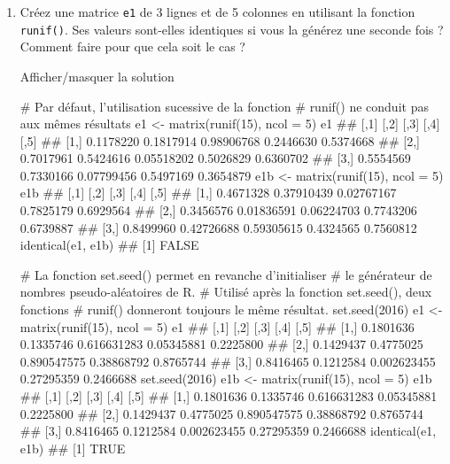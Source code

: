 \documentclass[12pt,]{article}
\newenvironment{Shaded}{}{}
\newcommand{\KeywordTok}[1]{\textcolor[rgb]{0.00,0.00,1.00}{{#1}}}
\newcommand{\DataTypeTok}[1]{{#1}}
\newcommand{\DecValTok}[1]{{#1}}
\newcommand{\StringTok}[1]{\textcolor[rgb]{0.00,0.50,0.50}{{#1}}}
\newcommand{\CommentTok}[1]{\textcolor[rgb]{0.00,0.50,0.00}{{#1}}}
\newcommand{\NormalTok}[1]{{#1}}
\begin{document}
\begin{enumerate}
\def\labelenumi{\alph{enumi}.}
\item
  Créez une matrice \texttt{e1} de 3 lignes et de 5 colonnes en
  utilisant la fonction \texttt{runif()}. Ses valeurs sont-elles
  identiques si vous la générez une seconde fois ? Comment faire pour
  que cela soit le cas ?

  Afficher/masquer la solution

  \hypertarget{sol20}{}
\begin{Shaded}
\begin{Highlighting}[]
\CommentTok{# Par défaut,  l'utilisation sucessive de la fonction}
\CommentTok{# runif() ne conduit pas aux mêmes résultats}
\NormalTok{e1 <-}\StringTok{ }\KeywordTok{matrix}\NormalTok{(}\KeywordTok{runif}\NormalTok{(}\DecValTok{15}\NormalTok{), }\DataTypeTok{ncol =} \DecValTok{5}\NormalTok{)}
\NormalTok{e1}
\NormalTok{##           [,1]      [,2]       [,3]      [,4]      [,5]}
\NormalTok{## [1,] 0.1178220 0.1817914 0.98906768 0.2446630 0.5374668}
\NormalTok{## [2,] 0.7017961 0.5424616 0.05518202 0.5026829 0.6360702}
\NormalTok{## [3,] 0.5554569 0.7330166 0.07799456 0.5497169 0.3654879}
\NormalTok{e1b <-}\StringTok{ }\KeywordTok{matrix}\NormalTok{(}\KeywordTok{runif}\NormalTok{(}\DecValTok{15}\NormalTok{), }\DataTypeTok{ncol =} \DecValTok{5}\NormalTok{)}
\NormalTok{e1b}
\NormalTok{##           [,1]       [,2]       [,3]      [,4]      [,5]}
\NormalTok{## [1,] 0.4671328 0.37910439 0.02767167 0.7825179 0.6929564}
\NormalTok{## [2,] 0.3456576 0.01836591 0.06224703 0.7743206 0.6739887}
\NormalTok{## [3,] 0.8499960 0.42726688 0.59305615 0.4324565 0.7560812}
\KeywordTok{identical}\NormalTok{(e1, e1b)}
\NormalTok{## [1] FALSE}

\CommentTok{# La fonction set.seed() permet en revanche d'initialiser}
\CommentTok{# le générateur de nombres pseudo-aléatoires de R. }
\CommentTok{# Utilisé après la fonction set.seed(), deux fonctions}
\CommentTok{# runif() donneront toujours le même résultat.}
\KeywordTok{set.seed}\NormalTok{(}\DecValTok{2016}\NormalTok{)}
\NormalTok{e1 <-}\StringTok{ }\KeywordTok{matrix}\NormalTok{(}\KeywordTok{runif}\NormalTok{(}\DecValTok{15}\NormalTok{), }\DataTypeTok{ncol =} \DecValTok{5}\NormalTok{)}
\NormalTok{e1}
\NormalTok{##           [,1]      [,2]        [,3]       [,4]      [,5]}
\NormalTok{## [1,] 0.1801636 0.1335746 0.616631283 0.05345881 0.2225800}
\NormalTok{## [2,] 0.1429437 0.4775025 0.890547575 0.38868792 0.8765744}
\NormalTok{## [3,] 0.8416465 0.1212584 0.002623455 0.27295359 0.2466688}
\KeywordTok{set.seed}\NormalTok{(}\DecValTok{2016}\NormalTok{)}
\NormalTok{e1b <-}\StringTok{ }\KeywordTok{matrix}\NormalTok{(}\KeywordTok{runif}\NormalTok{(}\DecValTok{15}\NormalTok{), }\DataTypeTok{ncol =} \DecValTok{5}\NormalTok{)}
\NormalTok{e1b}
\NormalTok{##           [,1]      [,2]        [,3]       [,4]      [,5]}
\NormalTok{## [1,] 0.1801636 0.1335746 0.616631283 0.05345881 0.2225800}
\NormalTok{## [2,] 0.1429437 0.4775025 0.890547575 0.38868792 0.8765744}
\NormalTok{## [3,] 0.8416465 0.1212584 0.002623455 0.27295359 0.2466688}
\KeywordTok{identical}\NormalTok{(e1, e1b)}
\NormalTok{## [1] TRUE}
\end{Highlighting}
\end{Shaded}


\end{enumerate}
\end{document}
